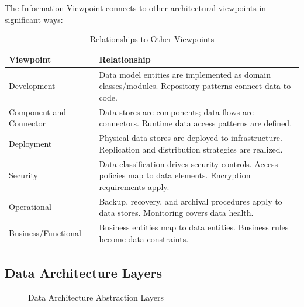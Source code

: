 \documentclass[11pt,letterpaper]{article}
\begin{document}
The Information Viewpoint connects to other architectural viewpoints in significant ways:

\begin{table}[H]
\centering
\caption{Relationships to Other Viewpoints}
\begin{tabular}{@{}L{3.5cm}L{10.5cm}@{}}
\toprule
\textbf{Viewpoint} & \textbf{Relationship} \\
\midrule
Development & Data model entities are implemented as domain classes/modules. Repository patterns connect data to code. \\
\addlinespace
Component-and-Connector & Data stores are components; data flows are connectors. Runtime data access patterns are defined. \\
\addlinespace
Deployment & Physical data stores are deployed to infrastructure. Replication and distribution strategies are realized. \\
\addlinespace
Security & Data classification drives security controls. Access policies map to data elements. Encryption requirements apply. \\
\addlinespace
Operational & Backup, recovery, and archival procedures apply to data stores. Monitoring covers data health. \\
\addlinespace
Business/Functional & Business entities map to data entities. Business rules become data constraints. \\
\bottomrule
\end{tabular}
\end{table}

\subsection{Data Architecture Layers}

\begin{figure}[H]
\centering
{}
\caption{Data Architecture Abstraction Layers}
\end{figure}
\end{document}
